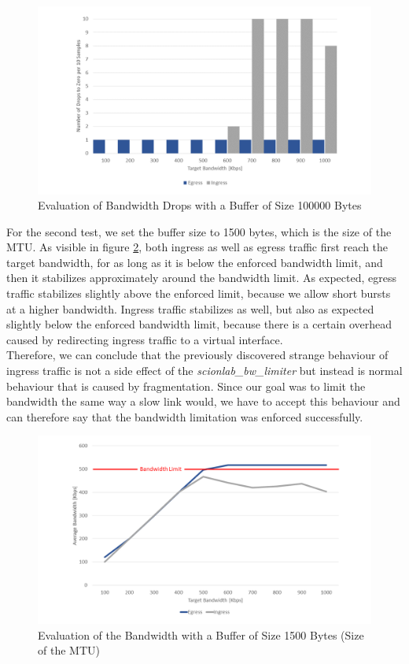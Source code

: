 \begin{figure}[h]
	\centering
	\includegraphics[width=\textwidth]{img/Evaluation-Zeros-Big-Buffer.png}
	\caption{Evaluation of Bandwidth Drops with a Buffer of Size 100000 Bytes}
	\label{Evaluation of Bandwidth Drops with a Buffer of Size 100000 Bytes}
\end{figure}
\newpage

For the second test, we set the buffer size to 1500 bytes, which is the size of the \acs{MTU}. As visible in figure \ref{Evaluation of the Bandwidth with a Buffer of Size 1500 Bytes (Size of the MTU)}, both ingress as well as egress traffic first reach the target bandwidth, for as long as it is below the enforced bandwidth limit, and then it stabilizes approximately around the bandwidth limit. As expected, egress traffic stabilizes slightly above the enforced limit, because we allow short bursts at a higher bandwidth. Ingress traffic stabilizes as well, but also as expected slightly below the enforced bandwidth limit, because there is a certain overhead caused by redirecting ingress traffic to a virtual interface.
\\
Therefore, we can conclude that the previously discovered strange behaviour of ingress traffic is not a side effect of the \textit{scionlab\_bw\_limiter} but instead is normal behaviour that is caused by fragmentation. Since our goal was to limit the bandwidth the same way a slow link would, we have to accept this behaviour and can therefore say that the bandwidth limitation was enforced successfully.

\begin{figure}[h]
	\centering
	\includegraphics[width=\textwidth]{img/Evaluation-Bandwidth-Small-Buffer.png}
	\caption{Evaluation of the Bandwidth with a Buffer of Size 1500 Bytes (Size of the MTU)}
	\label{Evaluation of the Bandwidth with a Buffer of Size 1500 Bytes (Size of the MTU)}
\end{figure}